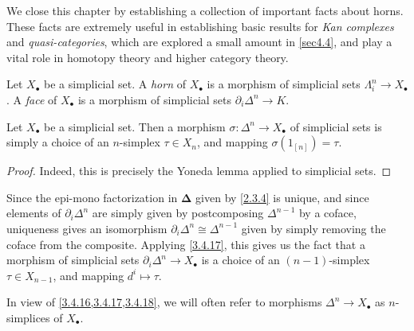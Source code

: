 We close this chapter by establishing a collection of important facts about horns. These facts are extremely useful in establishing basic results for \emph{Kan complexes} and \emph{quasi-categories}, which are explored a small amount in \cref{sec4.4}, and play a vital role in homotopy theory and higher category theory.

\begin{definition}\label{3.4.16}
	Let $X_{\bullet} $ be a simplicial set. A \emph{horn} of $X_{\bullet} $ is a morphism of simplicial sets $\Lambda_i^n \to X_{\bullet} $. A \emph{face} of $X_{\bullet} $ is a morphism of simplicial sets $\partial _i\Delta^n \to K$.
\end{definition}

\begin{lemma}\label{3.4.17}
	Let $X_{\bullet} $ be a simplicial set. Then a morphism $\sigma : \Delta^n \to X_{\bullet} $ of simplicial sets is simply a choice of an $n$-simplex $\tau\in X_n$, and mapping $\sigma(1_{[n]} )=\tau$.
\end{lemma}
\begin{proof}
	Indeed, this is precisely the Yoneda lemma applied to simplicial sets.
\end{proof}

\begin{remark}\label{3.4.18}
	Since the epi-mono factorization in $\boldsymbol{\Delta} $ given by \cref{2.3.4} is unique, and since elements of $\partial _i\Delta^n$ are simply given by postcomposing $\Delta^{n-1} $ by a coface, uniqueness gives an isomorphism $\partial_i\Delta^n\cong\Delta^{n-1} $ given by simply removing the coface from the composite. Applying \cref{3.4.17}, this gives us the fact that a morphism of simplicial sets $\partial _i\Delta^n \to X_{\bullet} $ is a choice of an $(n-1)$-simplex $\tau\in X_{n-1} $, and mapping $d^i \mapsto \tau$.
\end{remark}

\begin{terminology}\label{3.4.19}
	In view of \cref{3.4.16,3.4.17,3.4.18}, we will often refer to morphisms $\Delta^n \to X_{\bullet} $ as $n$-simplices of $X_{\bullet} $.
\end{terminology}


